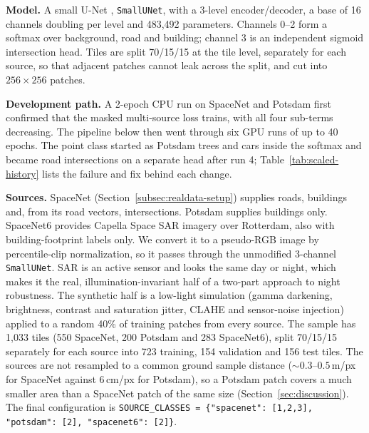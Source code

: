 \textbf{Model.} A small U-Net \cite{ronneberger2015unet}, \texttt{SmallUNet}, with a 3-level
encoder/decoder, a base of 16 channels doubling per level and 483,492 parameters. Channels 0--2
form a softmax over background, road and building; channel 3 is an independent sigmoid
intersection head. Tiles are split 70/15/15 at the tile level, separately for each source, so that
adjacent patches cannot leak across the split, and cut into $256\times256$ patches.

\textbf{Development path.} A 2-epoch CPU run on SpaceNet and Potsdam first confirmed that the masked
multi-source loss trains, with all four sub-terms decreasing. The pipeline below then went through
six GPU runs of up to 40 epochs. The point class started as Potsdam trees and cars inside the softmax and
became road intersections on a separate head after run 4; Table~\ref{tab:scaled-history} lists the
failure and fix behind each change.

\textbf{Sources.} SpaceNet (Section~\ref{subsec:realdata-setup}) supplies roads, buildings and,
from its road vectors, intersections. Potsdam supplies buildings only. SpaceNet6 provides Capella
Space SAR imagery over Rotterdam, also with building-footprint labels only. We convert it to a pseudo-RGB image by percentile-clip
normalization, so it passes through the unmodified 3-channel \texttt{SmallUNet}. SAR is an active
sensor and looks the same day or night, which makes it the real, illumination-invariant half of a
two-part approach to night robustness. The synthetic half is a low-light simulation (gamma
darkening, brightness, contrast and saturation jitter, CLAHE and sensor-noise injection) applied to
a random 40\% of training patches from every source. The sample has 1,033 tiles
(550 SpaceNet, 200 Potsdam and 283 SpaceNet6), split 70/15/15 separately for each source into 723
training, 154 validation and 156 test tiles. The sources are not resampled to a common ground
sample distance (${\sim}0.3$--$0.5$\,m/px for SpaceNet against 6\,cm/px for Potsdam), so a Potsdam patch
covers a much smaller area than a SpaceNet patch of the same size (Section~\ref{sec:discussion}).
The final configuration is
\texttt{SOURCE\_CLASSES = \{"spacenet": [1,2,3], "potsdam": [2], "spacenet6": [2]\}}.


